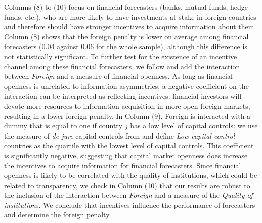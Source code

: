 Columns (8) to (10) focus on financial forecasters (banks, mutual funds, hedge funds, etc.), who are more likely to have investments at stake in foreign countries and therefore should have stronger incentives to acquire information about them. Column (8) shows that the foreign penalty is lower on average among financial forecasters (0.04 against 0.06 for the whole sample), although this difference is not statistically significant. To further test for the existence of an incentive channel among these financial forecasters, we follow \citet{Baeetal2008} and add the interaction between \textit{Foreign} and a measure of financial openness. As long as financial openness is unrelated to information asymmetries, a negative coefficient on the interaction can be interpreted as reflecting incentives: financial investors will devote more resources to information acquisition in more open foreign markets, resulting in a lower foreign penalty. In Column (9), Foreign is interacted with a dummy that is equal to one if country $j$ has a low level of capital controls: we use the measure of \emph{de jure} capital controls from \citet{Fernandez2016} and define \textit{Low-capital control} countries as the quartile with the lowest level of capital controls. This coefficient is significantly negative, suggesting that capital market openness does increase the incentives to acquire information for financial forecasters. Since financial openness is likely to be correlated with the quality of institutions, which could be related to transparency, we check in Column (10) that our results are robust to the inclusion of the interaction between \textit{Foreign} and a measure of the \textit{Quality of institution}s. We conclude that incentives influence the performance of forecasters and determine the foreign penalty.

